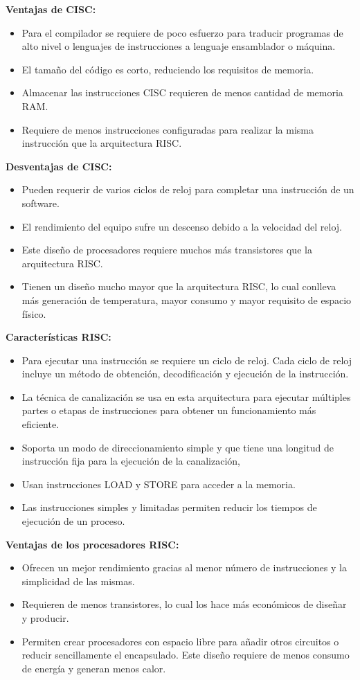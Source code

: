 \documentclass[12pt,letterpaper]{article}
\begin{document}
\begin{enumerate}
  \textbf{Ventajas de CISC:}
  \begin{itemize}
  \item Para el compilador se requiere de poco esfuerzo para traducir programas de alto nivel o lenguajes de instrucciones a lenguaje ensamblador o máquina.
  \item El tamaño del código es corto, reduciendo los requisitos de memoria.
  \item Almacenar las instrucciones CISC requieren de menos cantidad de memoria RAM.
  \item Requiere de menos instrucciones configuradas para realizar la misma instrucción que la arquitectura RISC.
  \end{itemize}
  
  \textbf{Desventajas de CISC:}
  \begin{itemize}
  \item Pueden requerir de varios ciclos de reloj para completar una instrucción de un software.
  \item El rendimiento del equipo sufre un descenso debido a la velocidad del reloj.
  \item Este diseño de procesadores requiere muchos más transistores que la arquitectura RISC.
  \item Tienen un diseño mucho mayor que la arquitectura RISC, lo cual conlleva más generación de temperatura, mayor consumo y mayor requisito de espacio físico.
  \end{itemize}

  \textbf{Características RISC:}
  \begin{itemize}
  \item Para ejecutar una instrucción se requiere un ciclo de reloj. Cada ciclo de reloj incluye un método de obtención, decodificación y ejecución de la instrucción.
  \item La técnica de canalización se usa en esta arquitectura para ejecutar múltiples partes o etapas de instrucciones para obtener un funcionamiento más eficiente.
  \item Soporta un modo de direccionamiento simple y que tiene una longitud de instrucción fija para la ejecución de la canalización,
  \item Usan instrucciones LOAD y STORE para acceder a la memoria.
  \item Las instrucciones simples y limitadas permiten reducir los tiempos de ejecución de un proceso.
  \end{itemize}
  
  \textbf{Ventajas de los procesadores RISC:}
  \begin{itemize}
  \item Ofrecen un mejor rendimiento gracias al menor número de instrucciones y la simplicidad de las mismas.
  \item Requieren de menos transistores, lo cual los hace más económicos de diseñar y producir.
  \item Permiten crear procesadores con espacio libre para añadir otros circuitos o reducir sencillamente el encapsulado.
    Este diseño requiere de menos consumo de energía y generan menos calor.
  \end{itemize}
  

\end{enumerate}
\end{document}
